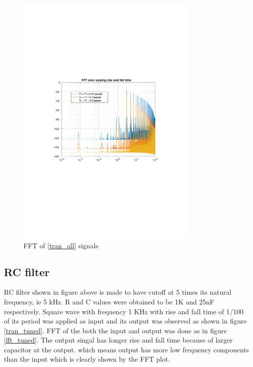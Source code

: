 \documentclass[12pt,a4paper,UKenglish]{article}
\begin{document}
\begin{figure} [H]
  \centering 
  \includegraphics[width=0.8\textwidth]{img/2b_fft.pdf} 
  \caption{FFT of \ref{tran_all} signals}
  \label{fft_all} 
\end{figure}


\subsection{RC filter}
RC filter shown in figure above is made to have cutoff at 5 times its natural frequency, ie 5 kHz. R and C values were obtained to be 1K and 25nF respectively. Square wave with frequency 1 KHz with rise and fall time of 1/100 of its period  was applied as input and its output was observed as shown in figure \ref{tran_tuned}.
FFT of the both the input and output was done as in figure \ref{fft_tuned}. The output singal has longer rise and fall time because of larger capacitor at the output. which means output has more low frequency components than the input which is clearly shown by the FFT plot.
\end{document}
